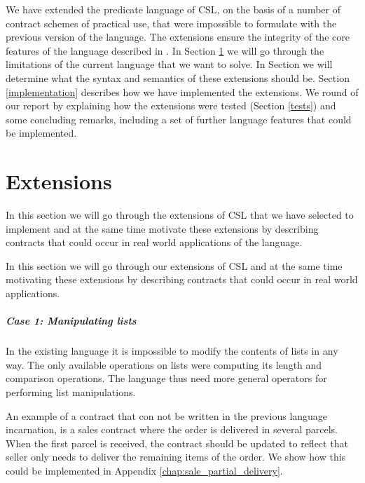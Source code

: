 \documentclass[10pt,a4paper,final,oneside,openany,article]{memoir}
\begin{document}
We have extended the predicate language of CSL, on the basis of a
number of contract schemes of practical use, that were impossible to
formulate with the previous version of the language. The extensions
ensure the integrity of the core features of the language described in
\cite{hvitved10}.  In Section \ref{extensions} we will go through the
limitations of the current language that we want to solve. In Section
we will determine what the syntax and semantics of these extensions
should be.  Section \ref{implementation} describes how we have
implemented the extensions. We round of our report by explaining how
the extensions were tested (Section \ref{tests}) and some concluding
remarks, including a set of further language features that could be
implemented.

\chapter{Extensions}
\label{extensions}
In this section we will go through the extensions of CSL that we have
selected to implement and at the same time motivate these extensions
by describing contracts that could occur in real world applications of
the language.

\label{extensions} In this section we will go through our extensions
of CSL and at the same time motivating these extensions by describing
contracts that could occur in real world applications.

\paragraph{Case 1: Manipulating lists} In the existing language it is
impossible to modify the contents of lists in any way. The only
available operations on lists were computing its length and comparison
operations. The language thus need more general operators for
performing list manipulations.

An example of a contract that con not be written in the previous
language incarnation, is a sales contract where the order is delivered
in several parcels. When the first parcel is received, the contract
should be updated to reflect that seller only needs to deliver the
remaining items of the order.  We show how this could be implemented
in Appendix \ref{chap:sale_partial_delivery}.
\end{document}
